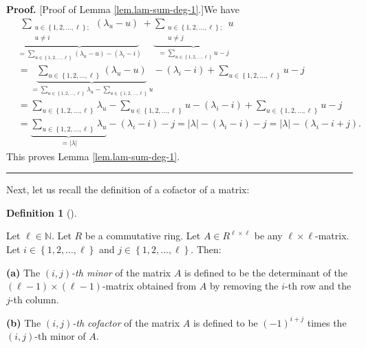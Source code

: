 \documentclass[numbers=enddot,12pt,final,onecolumn,notitlepage]{scrartcl}%
\theoremstyle{definition}
\newtheorem{defi}[theo]{Definition}
\newenvironment{definition}[1][]
{\begin{defi}[#1]\begin{leftbar}}
{\end{leftbar}\end{defi}}
\newenvironment{proof}[1][Proof]{\noindent\textbf{#1.} }{\ \rule{0.5em}{0.5em}}
\let\sumnonlimits\sum
\renewcommand{\sum}{\sumnonlimits\limits}
\begin{document}
\begin{proof}
[Proof of Lemma \ref{lem.lam-sum-deg-1}.]We have%
\begin{align*}
&  \underbrace{\sum_{\substack{u\in\left\{  1,2,\ldots,\ell\right\}  ;\\u\neq
i}}\left(  \lambda_{u}-u\right)  }_{=\sum_{u\in\left\{  1,2,\ldots
,\ell\right\}  }\left(  \lambda_{u}-u\right)  -\left(  \lambda_{i}-i\right)
}+\underbrace{\sum_{\substack{u\in\left\{  1,2,\ldots,\ell\right\}  ;\\u\neq
j}}u}_{=\sum_{u\in\left\{  1,2,\ldots,\ell\right\}  }u-j}\\
&  =\underbrace{\sum_{u\in\left\{  1,2,\ldots,\ell\right\}  }\left(
\lambda_{u}-u\right)  }_{=\sum_{u\in\left\{  1,2,\ldots,\ell\right\}  }%
\lambda_{u}-\sum_{u\in\left\{  1,2,\ldots,\ell\right\}  }u}-\left(
\lambda_{i}-i\right)  +\sum_{u\in\left\{  1,2,\ldots,\ell\right\}  }u-j\\
&  =\sum_{u\in\left\{  1,2,\ldots,\ell\right\}  }\lambda_{u}-\sum
_{u\in\left\{  1,2,\ldots,\ell\right\}  }u-\left(  \lambda_{i}-i\right)
+\sum_{u\in\left\{  1,2,\ldots,\ell\right\}  }u-j\\
&  =\underbrace{\sum_{u\in\left\{  1,2,\ldots,\ell\right\}  }\lambda_{u}%
}_{=\left\vert \lambda\right\vert }-\left(  \lambda_{i}-i\right)
-j=\left\vert \lambda\right\vert -\left(  \lambda_{i}-i\right)  -j=\left\vert
\lambda\right\vert -\left(  \lambda_{i}-i+j\right)  .
\end{align*}
This proves Lemma \ref{lem.lam-sum-deg-1}.
\end{proof}

Next, let us recall the definition of a cofactor of a matrix:

\begin{definition}
\label{def.det.cofactor}Let $\ell\in\mathbb{N}$. Let $R$ be a commutative
ring. Let $A\in R^{\ell\times\ell}$ be any $\ell\times\ell$-matrix. Let
$i\in\left\{  1,2,\ldots,\ell\right\}  $ and $j\in\left\{  1,2,\ldots
,\ell\right\}  $. Then:

\textbf{(a)} The $\left(  i,j\right)  $\textit{-th minor} of the matrix $A$ is
defined to be the determinant of the $\left(  \ell-1\right)  \times\left(
\ell-1\right)  $-matrix obtained from $A$ by removing the $i$-th row and the
$j$-th column.

\textbf{(b)} The $\left(  i,j\right)  $\textit{-th cofactor} of the matrix $A$
is defined to be $\left(  -1\right)  ^{i+j}$ times the $\left(  i,j\right)
$-th minor of $A$.
\end{definition}
\end{document}

